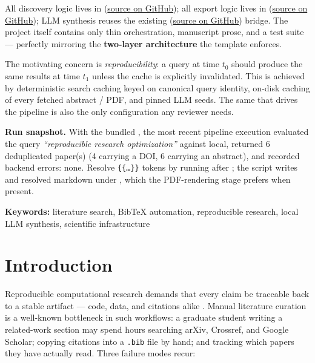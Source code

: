 \documentclass[
  english,
]{article}
\newcounter{none} %
\begin{document}
All discovery logic lives in 
(\href{https://github.com/docxology/template/tree/main/infrastructure/search/literature}{source
on GitHub}); all export logic lives in
(\href{https://github.com/docxology/template/tree/main/infrastructure/reference/citation}{source
on GitHub}); LLM synthesis reuses the existing
(\href{https://github.com/docxology/template/tree/main/infrastructure/llm}{source
on GitHub}) bridge. The project itself contains only thin orchestration,
manuscript prose, and a test suite --- perfectly mirroring the
\textbf{two-layer architecture} the template enforces.

The motivating concern is \emph{reproducibility}: a query at time
\(t_0\) should produce the same results at time \(t_1\) unless the cache
is explicitly invalidated. This is achieved by deterministic search
caching keyed on canonical query identity, on-disk caching of every
fetched abstract / PDF, and pinned LLM seeds. The same
 that drives the pipeline is also the
only configuration any reviewer needs.

\textbf{Run snapshot.} With the bundled ,
the most recent pipeline execution evaluated the query
\emph{``reproducible research optimization''} against local, returned 6
deduplicated paper(s) (4 carrying a DOI, 6 carrying an abstract), and
recorded backend errors: none. Resolve \texttt{\{\{…\}\}} tokens by
running  after
; the script writes
 and resolved markdown
under , which the PDF-rendering stage prefers
when present.

\textbf{Keywords:} literature search, BibTeX automation, reproducible
research, local LLM synthesis, scientific infrastructure

\newpage

\section{Introduction}\label{sec:introduction}

Reproducible computational research demands that every claim be
traceable back to a stable artifact --- code, data, and citations alike
\citep{peng2011reproducible}. Manual literature curation is a well-known
bottleneck in such workflows: a graduate student writing a related-work
section may spend hours searching arXiv, Crossref, and Google Scholar;
copying citations into a \texttt{.bib} file by hand; and tracking which
papers they have actually read. Three failure modes recur:
\end{document}
